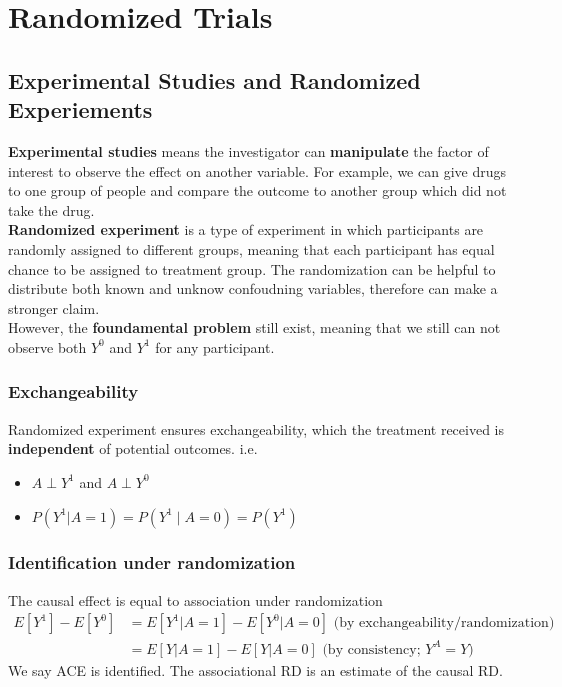 \section{Randomized Trials}
\subsection{Experimental Studies and Randomized Experiements}
\textbf{Experimental studies} means the investigator can \textbf{manipulate} the factor of interest to observe the effect on another variable. For example, we can give drugs to one group of people and compare the outcome to another group which did not take the drug.\\

\textbf{Randomized experiment} is a type of experiment in which participants are randomly assigned to different groups, meaning that each participant has equal chance to be assigned to treatment group. The randomization can be helpful to distribute both known and unknow confoudning variables, therefore can make a stronger claim.\\

However, the \textbf{foundamental problem} still exist, meaning that we still can not observe both $Y^0$ and $Y^1$ for any participant.
\subsubsection*{Exchangeability}
Randomized experiment ensures exchangeability, which the treatment received is \textbf{independent} of potential outcomes. i.e.
\begin{itemize}
    \item $A \perp Y^1$ and $A \perp Y^0$
    \item $P\left(Y^1|A=1\right)=P\left(Y^1 \mid A=0\right)=P\left(Y^1\right)$
\end{itemize}
\subsubsection*{Identification under randomization}
The causal effect is equal to association under randomization
\begin{align*}
E\left[Y^1\right]-E\left[Y^0\right] & =E\left[Y^1| A=1\right]-E\left[Y^0|A=0\right] \text{ (by exchangeability/randomization) } \\
& =E[Y|A=1]-E[Y|A=0] \text{ (by consistency; $Y^A=Y$)}
\end{align*}
We say ACE is identified. The associational RD is an estimate of the causal RD.
